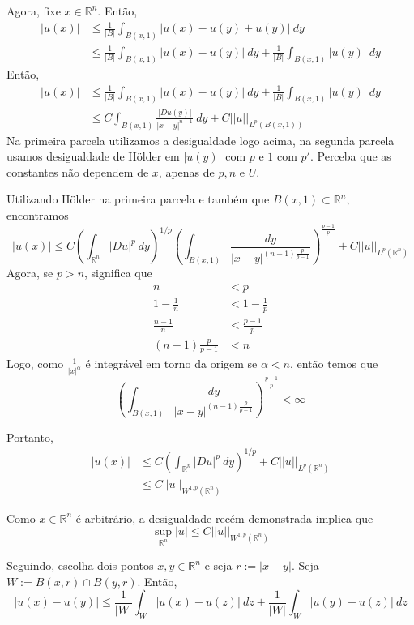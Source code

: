 \documentclass[11pt]{article}
\newcommand{\Rn}{{\mathbb{R}^n}}
\newcommand{\rn}{{\mathbb{R}^n}}
\begin{document}
Agora, fixe $x \in \Rn$. Então, \begin{align*}
	|u(x)| &  \leq \frac{1}{|B|}\int_{B(x,1)}|u(x) - u(y) + u(y)| \ dy \\
	  &\leq \frac{1}{|B|}\int_{B(x,1)} |u(x) - u(y)| \ dy + \frac{1}{|B|}\int_{B(x,1)}| u(y) |\ dy 
\end{align*}
Então, \begin{align*}
	|u(x)| &\leq \frac{1}{|B|}\int_{B(x,1)} |u(x) - u(y)| \ dy + \frac{1}{|B|}\int_{B(x,1)}| u(y) |\ dy \\
	&\leq C\int_{B(x,1)} \frac{|Du(y)|}{|x-y|^{n-1}}\ dy + C ||u||_{L^p(B(x,1))}
\end{align*}
Na primeira parcela utilizamos a desigualdade logo acima, na segunda parcela usamos desigualdade de Hölder em $|u(y)|$ com $p$ e $1$ com $p'$. Perceba que as constantes não dependem de $x$, apenas de $p, n$ e $U$.

Utilizando Hölder na primeira parcela e também que $B(x,1) \subset \Rn$, encontramos \[ |u(x)| \leq C \left(\int_\Rn |Du|^p \ dy \right)^{1/p}      \left(  \int_{B(x,1)} \frac{dy}{|x-y|^{(n-1)\frac{p}{p-1}}}  \right)^{\frac{p-1}{p}}      + C ||u||_{L^p(\Rn)} \] Agora, se $p>n$, significa que \begin{align*}	n &< p \\
	1 - \tfrac{1}{n} &< 1 - \tfrac{1}{p} \\
	\frac{n-1}{n} &< \frac{p-1}{p}	\\
	(n-1)\frac{p}{p-1} &< n
\end{align*} Logo, como $ \frac{1}{|x|^\alpha} $ é integrável em torno da origem se $\alpha<n$, então temos que \[ \left(  \int_{B(x,1)} \frac{dy}{|x-y|^{(n-1)\frac{p}{p-1}}}  \right)^{\frac{p-1}{p}}< \infty \]

Portanto, \begin{align*}
	|u(x)| &\leq C \left(\int_\Rn |Du|^p \ dy \right)^{1/p}          + C ||u||_{L^p(\Rn)} \\
	&\leq C ||u||_{W^{1,p}(\Rn)}
\end{align*}

Como $x \in \rn$ é arbitrário, a desigualdade recém demonstrada implica que \[ \sup_{\rn} |u| \leq C ||u||_{W^{1,p}(\rn)} \]



Seguindo, escolha dois pontos $x,y \in \rn$ e seja $r:= |x-y|$. Seja $W:= B(x,r) \cap B(y,r)$. Então, \[ |u(x) - u(y)| \leq \frac{1}{|W|}\int_W |u(x) -u(z)|\ dz + \frac{1}{|W|} \int_W |u(y) - u(z)| \ dz\]
\end{document}
